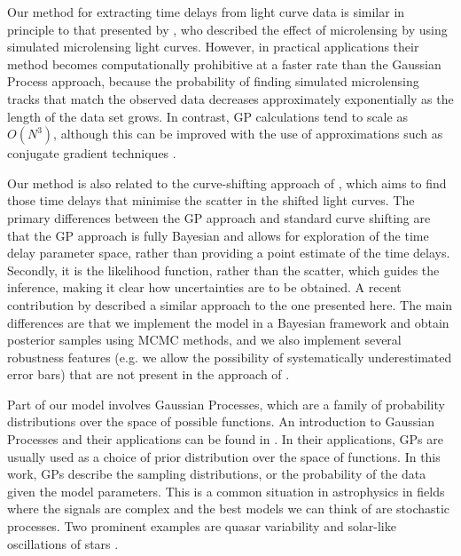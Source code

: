 \documentclass[useAMS,usenatbib, a4paper]{mn2e} \usepackage{natbib}
\begin{document}
Our method for extracting time delays from light curve data is similar in
principle to that presented by \citet{2008ApJ...676...80M}, who described the
effect of microlensing by using simulated microlensing light curves. However,
in practical applications their method becomes computationally prohibitive at
a faster rate than the Gaussian Process approach, because the probability of
finding simulated microlensing tracks that match the observed data decreases
approximately exponentially as the length of the data set grows. In contrast,
GP calculations tend to scale as $O(N^3)$, although this can be improved with
the use of approximations such as conjugate gradient techniques
\citep{gibbsmackay}.

Our method is also related to the curve-shifting approach of
\citet{1996A&A...305...97P}, which aims to find those time delays that
minimise the scatter in the shifted light curves. The primary differences
between the GP approach and standard curve shifting are that the GP approach
is fully Bayesian and allows for exploration of the time delay parameter
space, rather than providing a point estimate of the time delays.
Secondly, it is the likelihood
function, rather than the scatter, which guides the inference, making it clear
how uncertainties are to be obtained. A recent contribution by \citep{2013PhRvD..87l3512H}
described a similar approach to the one presented here. The main differences
are that we implement the model in a Bayesian framework and obtain posterior
samples using MCMC methods, and we also implement several robustness features
(e.g. we allow the possibility of systematically underestimated error bars)
that are not present in the approach of \citet{2013PhRvD..87l3512H}.

Part of our model involves Gaussian Processes, which are a family of probability
distributions over the space of possible functions.
An introduction to Gaussian Processes and their applications can be found in
\citet{rasmussen}. In their applications, GPs are usually used as a choice of
prior distribution over the space of functions. In this work, GPs describe the
sampling distributions, or the probability of the data given the model
parameters. This is a common situation in astrophysics in fields where the
signals are complex and the best models we can think of are 
stochastic processes. Two prominent examples are quasar
variability \citep{2009ApJ...698..895K, 2010ApJ...721.1014M, 2011ApJ...735...80Z}
and solar-like oscillations of stars \citep{2009MNRAS.395.2226B}.
\end{document}
